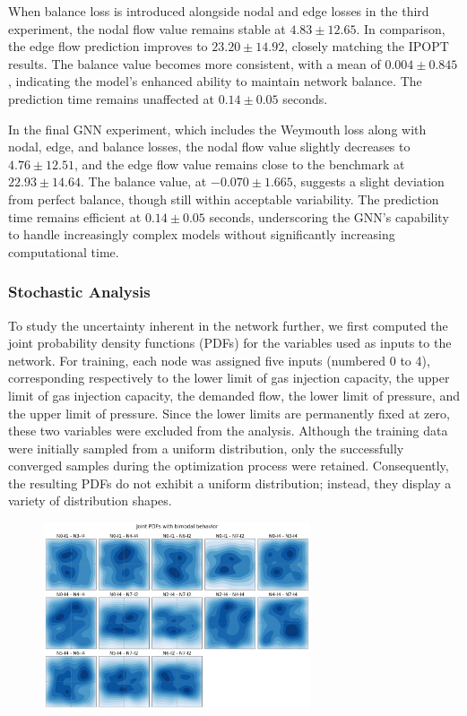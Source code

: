 When balance loss is introduced alongside nodal and edge losses in the third experiment, the nodal flow value remains stable at \( 4.83 \pm 12.65 \). In comparison, the edge flow prediction improves to \( 23.20 \pm 14.92 \), closely matching the IPOPT results. The balance value becomes more consistent, with a mean of \( 0.004 \pm 0.845 \), indicating the model's enhanced ability to maintain network balance. The prediction time remains unaffected at \( 0.14 \pm 0.05 \) seconds.

In the final GNN experiment, which includes the Weymouth loss along with nodal, edge, and balance losses, the nodal flow value slightly decreases to \( 4.76 \pm 12.51 \), and the edge flow value remains close to the benchmark at \( 22.93 \pm 14.64 \). The balance value, at \( -0.070 \pm 1.665 \), suggests a slight deviation from perfect balance, though still within acceptable variability. The prediction time remains efficient at \( 0.14 \pm 0.05 \) seconds, underscoring the GNN's capability to handle increasingly complex models without significantly increasing computational time.


\subsubsection{Stochastic Analysis}
To study the uncertainty inherent in the network further, we first computed the joint probability density functions (PDFs) for the variables used as inputs to the network. For training, each node was assigned five inputs (numbered 0 to 4), corresponding respectively to the lower limit of gas injection capacity, the upper limit of gas injection capacity, the demanded flow, the lower limit of pressure, and the upper limit of pressure. Since the lower limits are permanently fixed at zero, these two variables were excluded from the analysis. Although the training data were initially sampled from a uniform distribution, only the successfully converged samples during the optimization process were retained. Consequently, the resulting PDFs do not exhibit a uniform distribution; instead, they display a variety of distribution shapes.


\begin{figure}
    \begin{center}
        \includegraphics[width=0.7\textwidth]{figures/Chapter_NonLinealCensnet/PDF_inputs_inputs.png}
    \end{center}
    \caption{}\label{fig:joint_distributions_input_input}
\end{figure}
     



